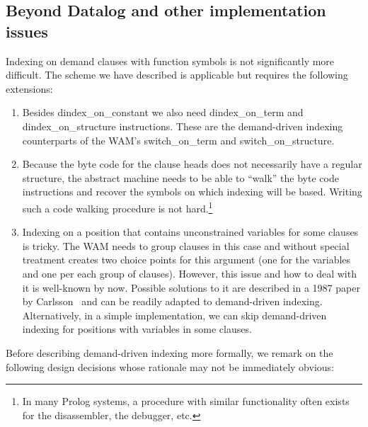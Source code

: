 \documentclass{llncs}
\newcommand{\instr}[1]{\textsf{#1}}
\newcommand{\jitiONterm}{\mbox{\instr{dindex\_on\_term}}\xspace}
\newcommand{\jitiONconstant}{\mbox{\instr{dindex\_on\_constant}}\xspace}
\newcommand{\jitiONstructure}{\mbox{\instr{dindex\_on\_structure}}\xspace}
\newcommand{\switchONterm}{\mbox{\instr{switch\_on\_term}}\xspace}
\newcommand{\switchONstructure}{\mbox{\instr{switch\_on\_structure}}\xspace}
\newcommand{\JITI}{demand-driven indexing\xspace}
\begin{document}
\subsection{Beyond Datalog and other implementation issues}
Indexing on demand clauses with function symbols is not significantly
more difficult. The scheme we have described is applicable but
requires the following extensions:
\begin{enumerate}
\item Besides \jitiONconstant we also need \jitiONterm and
  \jitiONstructure instructions. These are the \JITI counterparts of
  the WAM's \switchONterm and \switchONstructure.
\item Because the byte code for the clause heads does not necessarily
  have a regular structure, the abstract machine needs to be able to
  ``walk'' the byte code instructions and recover the symbols on which
  indexing will be based. Writing such a code walking procedure is not
  hard.\footnote{In many Prolog systems, a procedure with similar
  functionality often exists for the disassembler, the debugger, etc.}
\item Indexing on a position that contains unconstrained variables
  for some clauses is tricky. The WAM needs to group clauses in this
  case and without special treatment creates two choice points for
  this argument (one for the variables and one per each group of
  clauses). However, this issue and how to deal with it is well-known
  by now. Possible solutions to it are described in a 1987 paper by
  Carlsson~\cite{FreezeIndexing@ICLP-87} and can be readily adapted to
  \JITI. Alternatively, in a simple implementation, we can skip \JITI
  for positions with variables in some clauses.
\end{enumerate}
Before describing \JITI more formally, we remark on the following
design decisions whose rationale may not be immediately obvious:
\end{document}
